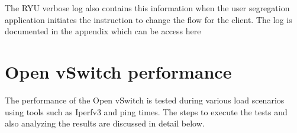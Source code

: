 The RYU verbose log also contains this information when the user segregation application initiates the instruction to change the flow for the client. The log is documented in the appendix which can be access here 
%	
\section{Open vSwitch performance}
The performance of the Open vSwitch is tested during various load scenarios using tools such as Iperfv3 and ping times. The steps to execute the tests and also analyzing the results are discussed in detail below.

